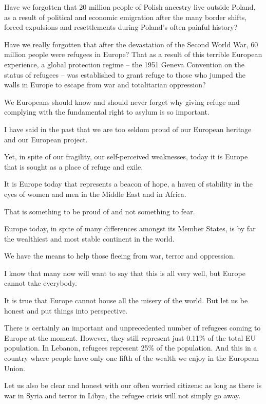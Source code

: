 \documentclass[a4paper,11pt]{article}
\begin{document}
Have we forgotten that 20 million people of Polish ancestry live outside Poland, as a result of political and economic emigration after the many border shifts, forced expulsions and resettlements during Poland’s often painful history?

Have we really forgotten that after the devastation of the Second World War, 60 million people were refugees in Europe? That as a result of this terrible European experience, a global protection regime – the 1951 Geneva Convention on the status of refugees – was established to grant refuge to those who jumped the walls in Europe to escape from war and totalitarian oppression?

We Europeans should know and should never forget why giving refuge and complying with the fundamental right to asylum is so important.

I have said in the past that we are too seldom proud of our European heritage and our European project.

Yet, in spite of our fragility, our self-perceived weaknesses, today it is Europe that is sought as a place of refuge and exile.

It is Europe today that represents a beacon of hope, a haven of stability in the eyes of women and men in the Middle East and in Africa.

That is something to be proud of and not something to fear.

Europe today, in spite of many differences amongst its Member States, is by far the wealthiest and most stable continent in the world.

We have the means to help those fleeing from war, terror and oppression.

I know that many now will want to say that this is all very well, but Europe cannot take everybody.

It is true that Europe cannot house all the misery of the world. But let us be honest and put things into perspective.

There is certainly an important and unprecedented number of refugees coming to Europe at the moment. However, they still represent just 0.11\% of the total EU population. In Lebanon, refugees represent 25\% of the population. And this in a country where people have only one fifth of the wealth we enjoy in the European Union.

Let us also be clear and honest with our often worried citizens: as long as there is war in Syria and terror in Libya, the refugee crisis will not simply go away.
\end{document}
